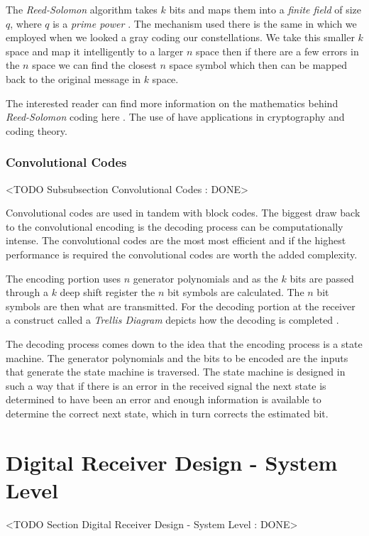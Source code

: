 The \emph{Reed-Solomon} algorithm takes $k$ bits and maps them into a \emph{finite field} of size $q$, where $q$ is a \emph{prime power} \cite{Sklar}. The mechanism used there is the same in which we employed when we looked a gray coding our constellations. We take this smaller $k$ space and map it intelligently to a larger $n$ space then if there are a few errors in the $n$ space we can find the closest $n$ space symbol which then can be mapped back to the original message in $k$ space.

The interested reader can find more information on the mathematics behind \emph{Reed-Solomon} coding here \cite{rsmath}. The use of  have applications in cryptography and coding theory. 
	
	
\subsubsection{Convolutional Codes}
	<TODO Subsubsection  Convolutional Codes : DONE>

Convolutional codes are used in tandem with block codes. The biggest draw back to the convolutional encoding is the decoding process can be computationally intense. The convolutional codes are the most most efficient and if the highest performance is required the convolutional codes are worth the added complexity.

The encoding portion uses $n$ generator polynomials and as the $k$ bits are passed through a $k$ deep shift register the $n$ bit symbols are calculated. The $n$ bit symbols are then what are transmitted. For the decoding portion at the receiver a construct called a \emph{Trellis Diagram} depicts how the decoding is completed \cite{trellis}.

The decoding process comes down to the idea that the encoding process is a state machine. The generator polynomials and the bits to be encoded are the inputs that generate the state machine is traversed. The state machine is designed in such a way that if there is an error in the received signal the next state is determined to have been an error and enough information is available to determine the correct next state, which in turn corrects the estimated bit.

\section{Digital Receiver Design - System Level}
	<TODO Section Digital Receiver Design - System Level : DONE>

